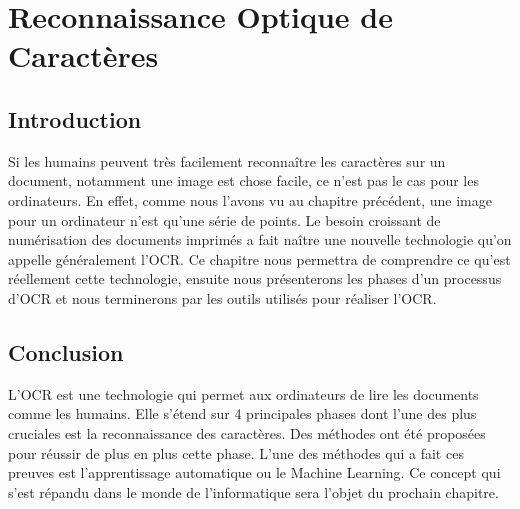 \chapter{\textbf{Reconnaissance Optique de Caractères}}
    \section{Introduction}
    Si les humains peuvent très facilement reconnaître les caractères sur un document, notamment une image est chose facile, ce n’est pas le cas pour les ordinateurs. En effet, comme nous l’avons vu au chapitre précédent, une image pour un ordinateur n’est qu’une série de points. Le besoin croissant de numérisation des documents imprimés a fait naître une nouvelle technologie qu’on appelle généralement l'OCR. Ce chapitre nous permettra de comprendre ce qu'est réellement cette technologie, ensuite nous présenterons les phases d’un processus d’OCR et nous terminerons par les outils utilisés pour réaliser l’OCR.
    
    
    
    

    \section{Conclusion}
    L’OCR est une technologie qui permet aux ordinateurs de lire les documents comme les humains. Elle s’étend sur 4 principales phases dont l’une des plus cruciales est la reconnaissance des caractères. Des méthodes ont été proposées pour réussir de plus en plus cette phase. L’une des méthodes qui a fait ces preuves est l’apprentissage automatique ou le Machine Learning. Ce concept qui s’est répandu dans le monde de l’informatique sera l’objet du prochain chapitre.